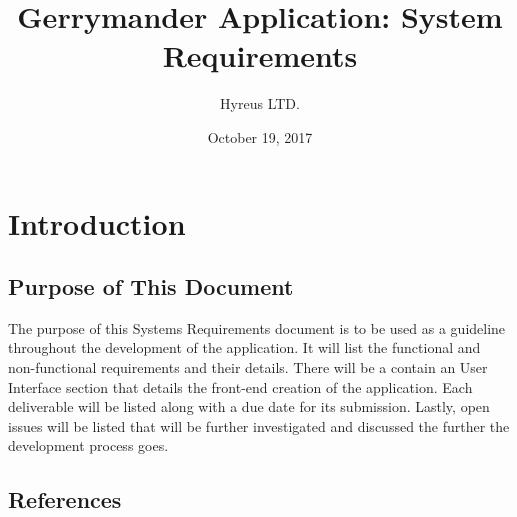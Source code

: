\documentclass{article}
\begin{document}
\begin{titlepage}
	\title{Gerrymander Application: System Requirements}
	\author{Hyreus LTD.}
	\date{October 19, 2017}
	\maketitle
	\thispagestyle{empty}
\end{titlepage}



\tableofcontents
\thispagestyle{empty}
\cleardoublepage

\setcounter{page}{1}



\section{Introduction}\label{sec:intro}


\subsection{Purpose of This Document}

\vspace{2.5mm}

\begin{addmargin}[4em]{0em}

The purpose of this Systems Requirements document is to be used as a guideline throughout the development of the application. It will list the functional and non-functional requirements and their details. There will be a contain an User Interface section that details the front-end creation of the application. Each deliverable will be listed along with a due date for its submission. Lastly, open issues will be listed that will be further investigated and discussed the further the development process goes.

\end{addmargin}

\vspace{2.5mm}


\subsection{References}

\vspace{2.5mm}
\end{document}
